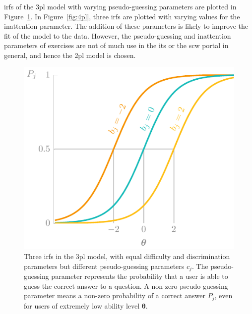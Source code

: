 \Glspl{irf} of the \gls{3pl} model with varying pseudo-guessing parameters are plotted in Figure~\ref{fig:3pl}.
In Figure~\ref{fig:4pl}, three \glspl{irf} are plotted with varying values for the inattention parameter.
The addition of these parameters is likely to improve the fit of the model to the data.
However, the pseudo-guessing and inattention parameters of exercises are not of much use in the \gls{its} or the \gls{scw} portal in general, and hence the \gls{2pl} model is chosen.

\begin{figure}
    \centering
    \includegraphics[page=4]{03-education/figures/tikzfigures.pdf}
    \caption[Item response functions of the 3PL model]{Three \glspl{irf} in the \gls{3pl} model, with equal difficulty and discrimination parameters but different pseudo-guessing parameters $c_j$. The pseudo-guessing parameter represents the probability that a user is able to guess the correct answer to a question. A non-zero pseudo-guessing parameter means a non-zero probability of a correct answer $P_j$, even for users of extremely low ability level $\bm\theta$.}
    \label{fig:3pl}
\end{figure}

